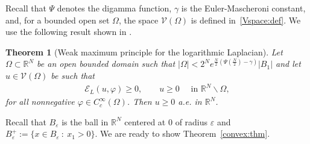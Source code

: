 \documentclass[11pt]{article}
\newcommand{\eps}{{\varepsilon}}
\newcommand{\R}{\mathbb{R}}
\numberwithin{equation}{section}
\newtheorem{theorem}{Theorem}[section]
\newcommand{\cE}{{\mathcal E}}
\begin{document}
Recall that $\Psi$ denotes the digamma function, $\gamma$ is the Euler-Mascheroni constant, and, for a bounded open set $\Omega$, the space ${\mathcal V}(\Omega)$ is defined in~\eqref{Vspace:def}.  We use the following result shown in \cite[Corollary 1.9]{CW19}.  
\begin{theorem}[Weak maximum principle for the logarithmic Laplacian]\label{mp:thm}
Let $\Omega \subset \R^N$ be an open bounded domain such that $|\Omega|<2^Ne^{\frac{N}{2} \left( \Psi \left( \frac{N}{2} \right)-\gamma \right)}|B_1|$ and let $u\in {\mathcal V}(\Omega)$ be such that
\begin{align*}
\cE_L(u,\varphi)\geq 0,\qquad u\geq 0\quad \text{ in }\R^N\backslash \Omega,
\end{align*}
for all nonnegative $\varphi\in C^\infty_c(\Omega)$.  Then $u\geq 0$ a.e. in $\R^N$.
\end{theorem}

Recall that $B_\eps$ is the ball in $\R^N$ centered at 0 of radius $\eps$ and $B_\eps^+:=\{x\in B_\eps\::\: x_1>0\}$.  We are ready to show Theorem~\ref{convex:thm}.
\end{document}
